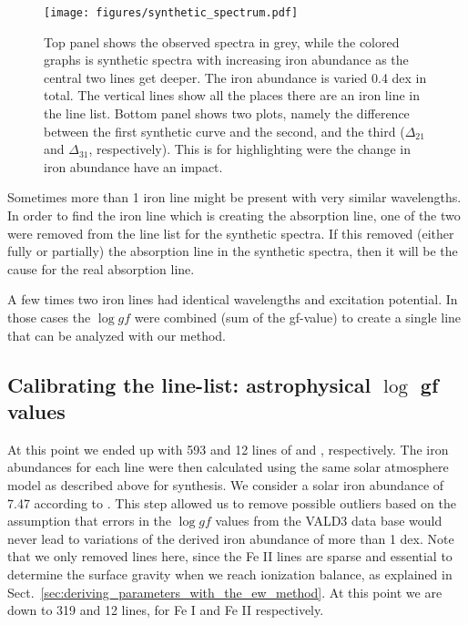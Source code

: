 \documentclass{aa}
\begin{document}
\begin{figure}[tpb]
    \centering
    \texttt{[image: figures/synthetic\_spectrum.pdf]}
    \caption{Top panel shows the observed spectra in grey, while
        the colored graphs is synthetic spectra with increasing iron
        abundance as the central two lines get deeper. The iron abundance
        is varied 0.4 dex in total. The vertical lines show all the places
        there are an iron line in the line list. Bottom panel shows
        two plots, namely the difference between the first synthetic curve
        and the second, and the third ($\Delta_{21}$ and $\Delta_{31}$,
        respectively). This is for highlighting were the change in iron
        abundance have an impact.}
    \label{fig:synthesis}
\end{figure}


Sometimes more than 1 iron line might be present with very similar
wavelengths. In order to find the iron line which is creating the
absorption line, one of the two were removed from the line list for
the synthetic spectra. If this removed (either fully or partially) the
absorption line in the synthetic spectra, then it will be the cause for
the real absorption line.

A few times two iron lines had identical wavelengths and excitation
potential. In those cases the $\log \mathit{gf}$ were combined (sum of
the gf-value) to create a single line that can be analyzed with our
method.


\subsection{Calibrating the line-list: astrophysical $\log$ gf values}
\label{ssub:Recalibrating-the-atomic-data}

At this point we ended up with 593 and 12 lines of  and ,
respectively. The iron abundances for each line were then calculated
using the same solar atmosphere model as described above for
synthesis. We consider a solar iron abundance of 7.47 according to
\cite{Gonzalez2000}. This step allowed us to remove possible outliers
based on the assumption that errors in the $\log \mathit{gf}$ values
from the VALD3 data base would never lead to variations of the derived
iron abundance of more than 1 dex. Note that we only removed  lines
here, since the Fe II lines are sparse and essential to determine the
surface gravity when we reach ionization balance, as explained in
Sect.~\ref{sec:deriving_parameters_with_the_ew_method}. At this point we
are down to 319 and 12 lines, for Fe I and Fe II respectively.
\end{document}
